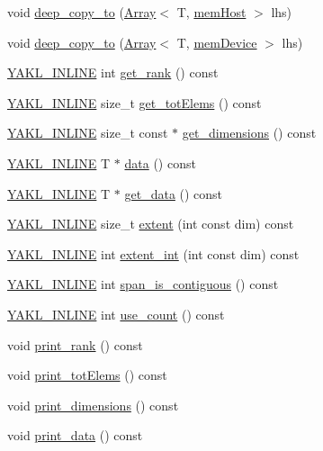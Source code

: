 \begin{DoxyCompactItemize}
\item 
void \hyperlink{classyakl_1_1Array_a5ecd5d8a795dffe245fcb2a7cfe02749}{deep\+\_\+copy\+\_\+to} (\hyperlink{classyakl_1_1Array}{Array}$<$ T, \hyperlink{namespaceyakl_aae8a8c910fec7cef7db68c9658c16405}{mem\+Host} $>$ lhs)
\item 
void \hyperlink{classyakl_1_1Array_a18be98af68fba9a1fa07f0c23378d56c}{deep\+\_\+copy\+\_\+to} (\hyperlink{classyakl_1_1Array}{Array}$<$ T, \hyperlink{namespaceyakl_ac3c32aec58c61e7f870081477ceee883}{mem\+Device} $>$ lhs)
\item 
\hyperlink{YAKL_8h_aa0dd629ffce6d564b19e9313fb91a5ad}{Y\+A\+K\+L\+\_\+\+I\+N\+L\+I\+NE} int \hyperlink{classyakl_1_1Array_a71a7973125942ecf4c15f10de27a4f08}{get\+\_\+rank} () const
\item 
\hyperlink{YAKL_8h_aa0dd629ffce6d564b19e9313fb91a5ad}{Y\+A\+K\+L\+\_\+\+I\+N\+L\+I\+NE} size\+\_\+t \hyperlink{classyakl_1_1Array_af527ddddda51769b64a7007c2b9bc14a}{get\+\_\+tot\+Elems} () const
\item 
\hyperlink{YAKL_8h_aa0dd629ffce6d564b19e9313fb91a5ad}{Y\+A\+K\+L\+\_\+\+I\+N\+L\+I\+NE} size\+\_\+t const  $\ast$ \hyperlink{classyakl_1_1Array_a337ee69b396e35e897b9a9b6ef8cefcd}{get\+\_\+dimensions} () const
\item 
\hyperlink{YAKL_8h_aa0dd629ffce6d564b19e9313fb91a5ad}{Y\+A\+K\+L\+\_\+\+I\+N\+L\+I\+NE} T $\ast$ \hyperlink{classyakl_1_1Array_a0be3f0f935a149d00530d92a1d90a222}{data} () const
\item 
\hyperlink{YAKL_8h_aa0dd629ffce6d564b19e9313fb91a5ad}{Y\+A\+K\+L\+\_\+\+I\+N\+L\+I\+NE} T $\ast$ \hyperlink{classyakl_1_1Array_ab085c126b12e617a5038f6675b729988}{get\+\_\+data} () const
\item 
\hyperlink{YAKL_8h_aa0dd629ffce6d564b19e9313fb91a5ad}{Y\+A\+K\+L\+\_\+\+I\+N\+L\+I\+NE} size\+\_\+t \hyperlink{classyakl_1_1Array_a599086e95055086b05b750b9acd605d0}{extent} (int const dim) const
\item 
\hyperlink{YAKL_8h_aa0dd629ffce6d564b19e9313fb91a5ad}{Y\+A\+K\+L\+\_\+\+I\+N\+L\+I\+NE} int \hyperlink{classyakl_1_1Array_a5bb64de950330bf36117961177149b42}{extent\+\_\+int} (int const dim) const
\item 
\hyperlink{YAKL_8h_aa0dd629ffce6d564b19e9313fb91a5ad}{Y\+A\+K\+L\+\_\+\+I\+N\+L\+I\+NE} int \hyperlink{classyakl_1_1Array_a6b821bfa69a3272560a5f21ef4a6ed07}{span\+\_\+is\+\_\+contiguous} () const
\item 
\hyperlink{YAKL_8h_aa0dd629ffce6d564b19e9313fb91a5ad}{Y\+A\+K\+L\+\_\+\+I\+N\+L\+I\+NE} int \hyperlink{classyakl_1_1Array_a68b8707eb5f271b577d72270dc1a8425}{use\+\_\+count} () const
\item 
void \hyperlink{classyakl_1_1Array_a136bdaac16343e41a7b3c19f1b1ee670}{print\+\_\+rank} () const
\item 
void \hyperlink{classyakl_1_1Array_aac2e9242b98e126aedf149c53b4998ea}{print\+\_\+tot\+Elems} () const
\item 
void \hyperlink{classyakl_1_1Array_a4de9e24164b62fde2bb923016e1fa1d1}{print\+\_\+dimensions} () const
\item 
void \hyperlink{classyakl_1_1Array_ab2c110e45f00e277afe6438fb20e230d}{print\+\_\+data} () const
\end{DoxyCompactItemize}
